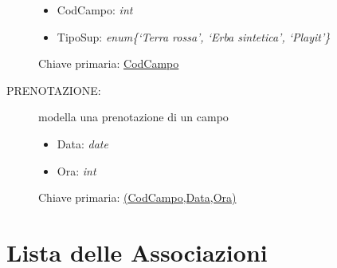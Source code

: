 \begin{description}
\begin{itemize}
\item CodCampo: \textit{int} \hfill 
\item TipoSup: \textit{enum\{‘Terra rossa’, ‘Erba sintetica’, ‘Playit’\}}
\end{itemize}
Chiave primaria: \underline{CodCampo} \hfill 
\item[PRENOTAZIONE:] modella una prenotazione di un campo
\begin{itemize}
\item Data: \textit{date} \hfill 
\item Ora: \textit{int} \hfill  
\end{itemize}
Chiave primaria: \underline{(CodCampo,Data,Ora)} \hfill 
\end{description}

\section{Lista delle Associazioni}

